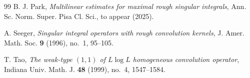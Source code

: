 \documentclass[11pt]{amsart}
\begin{document}
\begin{thebibliography}{99}
	B. J. Park,
	{\it Multilinear estimates for maximal rough singular integrals},
	Ann. Sc. Norm. Super. Pisa Cl. Sci., to appear (2025).
	
	A. Seeger,
	{\it Singular integral operators with rough convolution kernels},
	J. Amer. Math. Soc. \textbf{9} (1996), no.~1, 95--105.
	
	T. Tao,
	{\it The weak-type $(1,1)$ of $L\log L$ homogeneous convolution operator},
	Indiana Univ. Math. J. \textbf{48} (1999), no.~4, 1547--1584.
	
\end{thebibliography}
\end{document}
